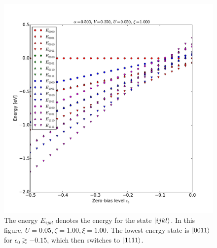 \begin{figure}[h]
    \centering
    \includegraphics[height=.45\textheight]{pdf/energy/pespin_distribution_u1_k2.pdf}
    \caption{The energy $E_{ijkl}$ denotes the energy for the state $\ket{ijkl}$. In this figure, $U=0.05, \zeta=1.00, \xi=1.00$. The lowest energy state is $\ket{0011}$ for $\epsilon_0\gtrsim -0.15$, which then switches to $\ket{1111}$.}
    \label{fig:perspinenergy12}
\end{figure} 
